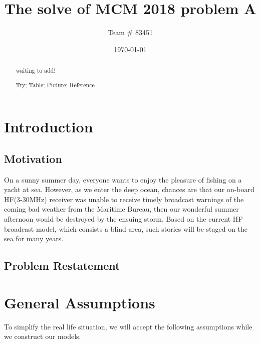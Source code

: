 \documentclass{mcmthesis}
\title{ The solve of MCM 2018 problem A }
\author{\small Team \# 83451}
\date{\today}
\begin{document}
\begin{abstract}

waiting to add!

\begin{keywords}
  Try; Table; Picture; Reference
\end{keywords}
\end{abstract}
\maketitle

\tableofcontents
\newpage

\section{Introduction}

\subsection{Motivation}

On a sunny summer day, everyone wants to enjoy the pleasure of fishing on a yacht at sea. However, as we enter the deep ocean, chances are that our on-board HF(3-30MHz) receiver was unable to receive timely broadcast warnings of the coming bad weather from the Maritime Bureau, then our wonderful summer afternoon would be destroyed by the ensuing storm. Based on the current HF broadcast model, which consists a blind area, such stories will be staged on the sea for many years.

\subsection{Problem Restatement}


\section{General Assumptions}

    To simplify the real life situation, we will accept the following assumptions while we construct our models.
\end{document}
